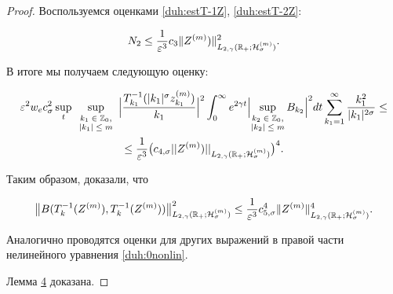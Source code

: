 \begin{proof}
Воспользуемся  оценками \eqref{duh:estT-1Z}, \eqref{duh:estT-2Z}:

\begin{equation}

N_2 \le \frac{1}{\varepsilon^3}c_3\|Z^{(m)})\|^2_{L_{2,\gamma}(\mathbb R_{+};{\cal H}^{(m)}_{\sigma})}.

\label{duh:T_k}

\end{equation}

В итоге мы получаем следующую оценку:

\begin{multline*}

\varepsilon^2 w_e c_\sigma^2 \sup_{t}\sup_{\scriptsize \begin{array}{c} k_1\in \mathbb Z_0, \\ |k_1|\le m \end{array}} \Bigl|\frac{T^{-1}_{k_1}(|k_1|^\sigma z_{k_1}^{(m)})}{k_1}\Bigr|^2 





\int_0^\infty e^{2\gamma t}

\Bigl|\!\!\! \sup_{\scriptsize \begin{array}{c} k_2\in \mathbb Z_0, \\ |k_2|\le m \end{array}}\!\!\! B_{k_2}\Bigr|^2dt \sum_{k_1=1}^{\infty} \frac{k_1^2}{|k_1|^{2\sigma}}\le

\\

\le \frac{1}{\varepsilon^3}\bigl(c_{4,\sigma}||Z^{(m)})||_{L_{2,\gamma}(\mathbb R_{+};{\cal H}^{(m)}_{\sigma})}\bigr)^4.

\end{multline*}

Таким образом, доказали, что

\begin{equation}

\bigl\| B(T^{-1}_{k}(Z^{(m)}),T^{-1}_{k}(Z^{(m)}))\bigr\|^2_{L_{2,\gamma}(\mathbb R_{+};{\cal H}^{(m)}_{\sigma})}

\le 

\frac{1}{\varepsilon^3} c_{5,\sigma}^4\|Z^{(m)} \|^4_{L_{2,\gamma}(\mathbb R_{+};{\cal H}^{(m)}_{\sigma})}.

\label{duh:estB_k}

\end{equation}





Аналогично проводятся оценки для других выражений в правой части нелинейного уравнения \eqref{duh:0nonlin}.

Лемма \hyperlink{dukh:lemma4}{4} доказана.

\end{proof}





